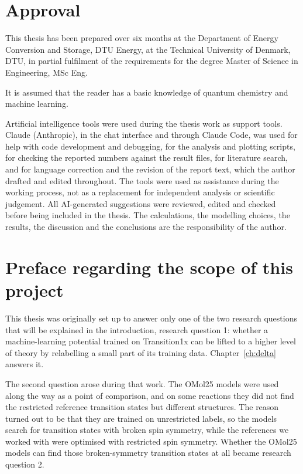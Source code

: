 
\section*{Approval}
This thesis has been prepared over six months at the Department of
Energy Conversion and Storage, DTU Energy, at the Technical University
of Denmark, DTU, in partial fulfilment of the requirements for the
degree Master of Science in Engineering, MSc Eng.

It is assumed that the reader has a basic knowledge of quantum
chemistry and machine learning.

Artificial intelligence tools were used during the thesis work as
support tools. Claude (Anthropic), in the chat interface and through
Claude Code, was used for help with code development and debugging,
for the analysis and
plotting scripts, for checking the reported numbers against the
result files, for literature search, and for language correction and
the revision of the report text, which the author drafted and edited
throughout. The tools were used as assistance during the working
process, not as a replacement for independent analysis or scientific
judgement. All AI-generated suggestions were reviewed, edited and
checked before being included in the thesis. The calculations, the
modelling choices, the results, the discussion and the conclusions
are the responsibility of the author.

\vfill

\begin{center}
\namesigdate{\thesisauthor~-~\studentnumber}
\end{center}

\vfill

\newpage
\section*{Preface regarding the scope of this project}
This thesis was originally set up to answer only one of the two
research questions that will be explained in the introduction,
research question 1: whether a machine-learning potential trained on
Transition1x can be lifted to a higher level of theory by relabelling
a small part of its training data. Chapter~\ref{ch:delta} answers it.

The second question arose during that work. The OMol25 models were
used along the way as a point of comparison, and on some reactions
they did not find the restricted reference transition states but
different structures. The reason turned out to be that they are
trained on unrestricted labels, so the models search for transition
states with
broken spin symmetry, while the references we worked with were
optimised with restricted spin symmetry. Whether the OMol25 models can find
those broken-symmetry transition states at all became research
question 2.

